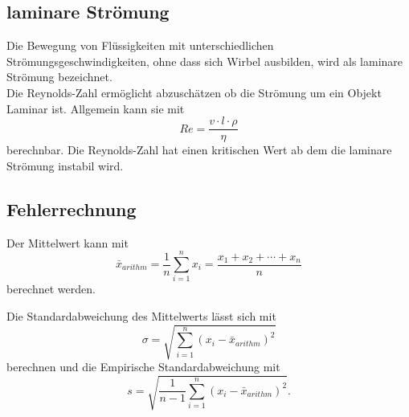 \subsection{laminare Strömung}
Die Bewegung von Flüssigkeiten mit unterschiedlichen Strömungsgeschwindigkeiten, ohne dass sich Wirbel ausbilden, wird als laminare Strömung bezeichnet.\\

Die Reynolds-Zahl ermöglicht abzuschätzen ob die Strömung um ein Objekt Laminar ist. Allgemein kann sie mit
\begin{equation}
    Re = \frac{v \cdot l \cdot ρ}{η}
\end{equation}
berechnbar. Die Reynolds-Zahl hat einen kritischen Wert ab dem die laminare Strömung instabil wird.

\subsection{Fehlerrechnung}

Der Mittelwert kann mit 
\begin{equation}
    \bar{x}_{arithm} = \frac{1}{n}  \sum_{i=1}^n x_i = \frac{x_1 + x_2 + \cdots + x_n}{n}
    \label{eqn:6}
\end{equation}
berechnet werden.

Die Standardabweichung des Mittelwerts lässt sich mit
\begin{equation}
    \sigma = \sqrt{\sum_{i=1}^n (x_i - \bar{x}_{arithm})^2}
    \label{eqn:7}
\end{equation}
berechnen und die Empirische Standardabweichung mit
\begin{equation}
    s = \sqrt{\frac{1}{n - 1} \sum_{i=1}^n (x_i - \bar{x}_{arithm})^2} .
    \label{eqn:8}
\end{equation}
